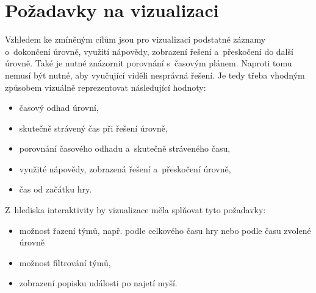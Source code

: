 \documentclass[
  digital, %
  oneside, %
  table,   %
  nolof,     %
  nolot,     %
  nocover
]{fithesis3}
\begin{document}
\section{Požadavky na vizualizaci}
Vzhledem ke zmíněným cílům jsou pro vizualizaci podstatné záznamy o~dokončení úrovně, využití nápovědy, zobrazení řešení a~přeskočení do další úrovně. Také je nutné znázornit porovnání s~časovým plánem. Naproti tomu nemusí být nutné, aby vyučující viděli nesprávná řešení. Je tedy třeba vhodným způsobem vizuálně reprezentovat následující hodnoty:
\begin{itemize}
  \item časový odhad úrovní,
  \item skutečně strávený čas při řešení úrovně,
  \item porovnání časového odhadu a~skutečně stráveného času,
  \item využité nápovědy, zobrazená řešení a~přeskočení úrovně,
  \item čas od začátku hry.
\end{itemize}
Z~hlediska interaktivity by vizualizace měla splňovat tyto požadavky:
\begin{itemize}
  \item možnost řazení týmů, např. podle celkového času hry nebo podle času zvolené úrovně
  \item možnost filtrování týmů,
  \item zobrazení popisku události po najetí myší.
\end{itemize}
\end{document}
